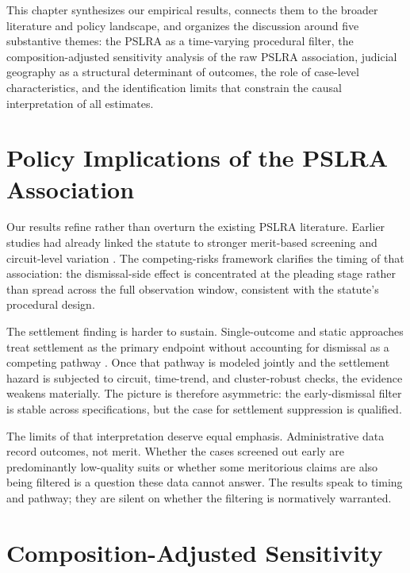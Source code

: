 
This chapter synthesizes our empirical results, connects them to the broader literature and policy landscape, and organizes the discussion around five substantive themes: the PSLRA as a time-varying procedural filter, the composition-adjusted sensitivity analysis of the raw PSLRA association, judicial geography as a structural determinant of outcomes, the role of case-level characteristics, and the identification limits that constrain the causal interpretation of all estimates.

\section{Policy Implications of the PSLRA Association}

Our results refine rather than overturn the existing PSLRA
literature. Earlier studies had already linked the statute to
stronger merit-based screening and circuit-level variation
\citep{johnson2007, choi2007, perino2003}. The competing-risks framework clarifies the timing of that
association: the dismissal-side effect is concentrated at the
pleading stage rather than spread across the full observation
window, consistent with the statute's procedural design.

The settlement finding is harder to sustain. Single-outcome
and static approaches treat settlement as the primary endpoint
without accounting for dismissal as a competing pathway
\citep{brochet2014, cox2008}. Once that pathway is modeled
jointly and the settlement hazard is subjected to circuit,
time-trend, and cluster-robust checks, the evidence weakens
materially. The picture is therefore asymmetric: the
early-dismissal filter is stable across specifications, but
the case for settlement suppression is qualified.

The limits of that interpretation deserve equal emphasis.
Administrative data record outcomes, not merit. Whether the
cases screened out early are predominantly low-quality suits
or whether some meritorious claims are also being filtered is
a question these data cannot answer. The results speak to
timing and pathway; they are silent on whether the filtering
is normatively warranted.

\section{Composition-Adjusted Sensitivity}

